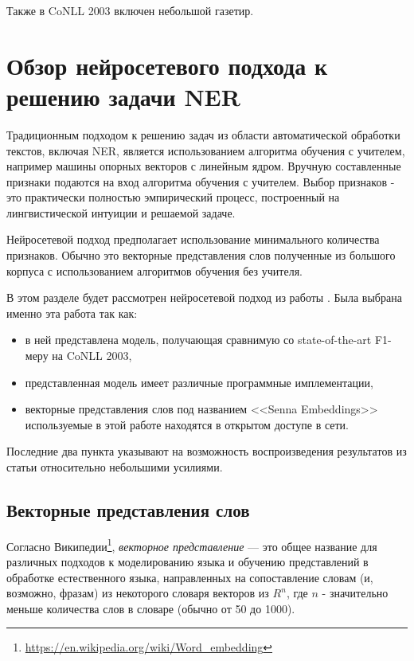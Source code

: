   Также в CoNLL 2003 включен небольшой газетир.

  \section{Обзор нейросетевого подхода к решению задачи NER}

  Традиционным подходом к решению задач из области автоматической обработки текстов,
  включая NER, является использованием алгоритма обучения с учителем, например
  машины опорных векторов с линейным ядром. Вручную составленные признаки подаются на вход
  алгоритма обучения с учителем. Выбор признаков - это практически полностью эмпирический
  процесс, построенный на лингвистической интуиции и решаемой задаче.

  Нейросетевой подход предполагает использование минимального количества признаков.
  Обычно это векторные представления слов полученные из большого корпуса с использованием
  алгоритмов обучения без учителя.

  В этом разделе будет рассмотрен нейросетевой подход из работы
  \citep{collobert2011natural}. Была выбрана именно эта работа так как:
  \begin{itemize}
  \item в ней представлена модель, получающая сравнимую со state-of-the-art F1-меру на CoNLL 2003,
  \item представленная модель имеет различные программные имплементации,
  \item векторные представления слов под названием <<Senna Embeddings>>
    используемые в этой работе находятся в открытом доступе в сети.
  \end{itemize}
  Последние два пункта указывают на возможность воспроизведения результатов из статьи относительно небольшими усилиями.

  \subsection{Векторные представления слов}

  Согласно Википедии\footnote{\url{https://en.wikipedia.org/wiki/Word_embedding}},
  \textit{векторное представление} — это общее название для различных
  подходов к моделированию языка и обучению представлений в обработке естественного языка,
  направленных на сопоставление словам (и, возможно, фразам) из некоторого словаря
  векторов из $R^n$, где $n$ - значительно меньше количества слов в словаре (обычно от 50 до 1000).

